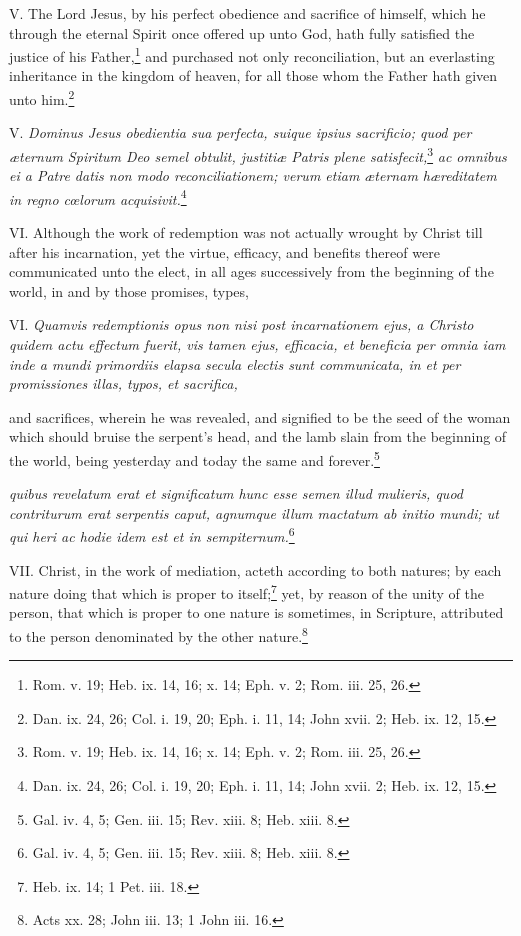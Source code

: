 V. The Lord Jesus, by his perfect obedience and sacrifice of himself, which he through the eternal Spirit once offered up unto God, hath fully satisfied the justice of his Father,\footnote{Rom. v. 19; Heb. ix. 14, 16; x. 14; Eph. v. 2; Rom. iii. 25, 26.} and purchased not only reconciliation, but an everlasting inheritance in the kingdom of heaven, for all those whom the Father hath given unto him.\footnote{Dan. ix. 24, 26; Col. i. 19, 20; Eph. i. 11, 14; John xvii. 2; Heb. ix. 12, 15.}

V. \emph{Dominus Jesus obedientia sua perfecta, suique ipsius sacrificio; quod per æternum Spiritum Deo semel obtulit, justitiæ Patris plene satisfecit,}\footnote{Rom. v. 19; Heb. ix. 14, 16; x. 14; Eph. v. 2; Rom. iii. 25, 26.}\emph{ ac omnibus ei a Patre datis non modo reconciliationem; verum etiam æternam hæreditatem in regno cœlorum acquisivit.}\footnote{Dan. ix. 24, 26; Col. i. 19, 20; Eph. i. 11, 14; John xvii. 2; Heb. ix. 12, 15.}

VI. Although the work of redemption was not actually wrought by Christ till after his incarnation, yet the virtue, efficacy, and benefits thereof were communicated unto the elect, in all ages successively from the beginning of the world, in and by those promises, types,

VI. \emph{Quamvis redemptionis opus non nisi post incarnationem ejus, a Christo quidem actu effectum fuerit, vis tamen ejus, efficacia, et beneficia per omnia iam inde a mundi primordiis elapsa secula electis sunt communicata, in et per promissiones illas, typos, et sacrifica, }

and sacrifices, wherein he was revealed, and signified to be the seed of the woman which should bruise the serpent's head, and the lamb slain from the beginning of the world, being yesterday and today the same and forever.\footnote{Gal. iv. 4, 5; Gen. iii. 15; Rev. xiii. 8; Heb. xiii. 8.}

\emph{quibus revelatum erat et significatum hunc esse semen illud mulieris, quod contriturum erat serpentis caput, agnumque illum mactatum ab initio mundi; ut qui heri ac hodie idem est et in sempiternum.}\footnote{Gal. iv. 4, 5; Gen. iii. 15; Rev. xiii. 8; Heb. xiii. 8.}

VII. Christ, in the work of mediation, acteth according to both natures; by each nature doing that which is proper to itself;\footnote{Heb. ix. 14; 1 Pet. iii. 18.} yet, by reason of the unity of the person, that which is proper to one nature is sometimes, in Scripture, attributed to the person denominated by the other nature.\footnote{Acts xx. 28; John iii. 13; 1 John iii. 16.}

